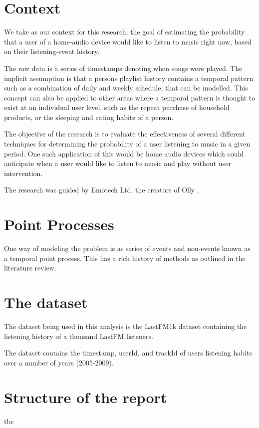 \section{Context}

We take as our context for this research, the goal of estimating the probability that a user of a home-audio device would like to listen to music right now, based on their listening-event history. 

The raw data is a series of timestamps denoting when songs were played. The implicit assumption is that a persons playlist history contains a temporal pattern such as a combination of daily and weekly schedule, that can be modelled. This concept can also be applied to other areas where a temporal pattern is thought to exist at an individual user level, such as the repeat purchase of household products, or the sleeping and eating habits of a person.

The objective of the research is to evaluate the effectiveness of several different techniques for determining the probability of a user listening to music in a given period. One such application of this would be home audio devices which could anticipate when a user would like to listen to music and play without user intervention.

The research was guided by Emotech Ltd. the creators of Olly \parencite{Olly}.

\section{Point Processes}

One way of modeling the problem is as series of events and non-events known as a temporal point process. This has a rich history of methods as outlined in the literature review. 


\section{The dataset}
The dataset being used in this analysis is the LastFM1k dataset containing the listening history of a thousand LastFM listeners.

The dataset contains the timestamp, userId, and trackId of users listening habits over a number of years (2005-2009).

\section{Structure of the report}
tbc

